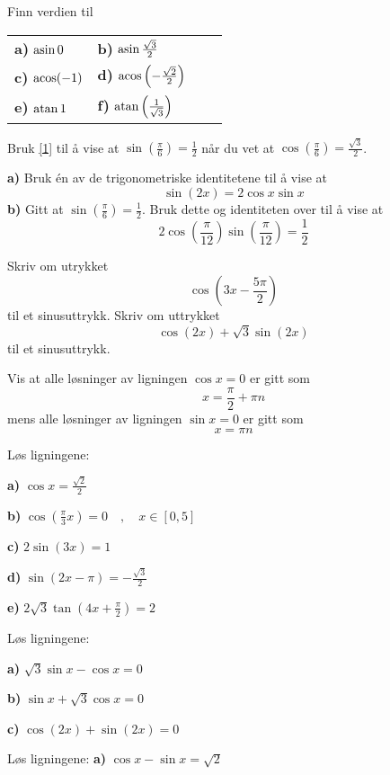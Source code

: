 Finn verdien til\\ \renewcommand{\arraystretch}{1.7}
\begin{tabular}{@{}l l l l }	
\textbf{a)} $ \operatorname{asin} 0 $ &\quad\textbf{b)} $ \operatorname{asin} \frac{\sqrt{3}}{2} $ \\
 \textbf{c)} $ \operatorname{acos} (-1) $ &\quad\textbf{d)} $ \operatorname{acos} \left(-\frac{\sqrt{2}}{2}\right) $ \\
 \textbf{e)} $ \operatorname{atan} 1 $ &\quad\textbf{f)} $ \operatorname{atan} \left(\frac{1}{\sqrt{3}}\right) $
\end{tabular}\renewcommand{\arraystretch}{1}

Bruk \eqref{1} til å vise at $ {\sin\left(\frac{\pi}{6}\right)=\frac{1}{2}} $ når du vet at $ \cos\left(\frac{\pi}{6}\right)=\frac{\sqrt{3}}{2} $.

\textbf{a)} Bruk én av de trigonometriske identitetene til å vise at
\[  \sin (2x)=2\cos x\sin x \]
\textbf{b)} Gitt at $ {\sin \left(\frac{\pi}{6}\right)=\frac{1}{2}} $. Bruk dette og identiteten over til å vise at
\[ 2\cos \left(\frac{\pi}{12}\right)\sin \left(\frac{\pi}{12}\right) = \frac{1}{2} \]

Skriv om utrykket
\[ \cos \left(3x-\frac{5\pi}{2}\right) \]
til et sinusuttrykk.
\newpage
{}
Skriv om uttrykket \[ \cos( 2x) + \sqrt 3\sin (2x) \]
til et sinusuttrykk.

\nes

Vis at alle løsninger av ligningen $ \cos x=0 $ er gitt som
\[ x = \frac{\pi}{2}+\pi n \]
mens alle løsninger av ligningen $ \sin x = 0 $ er gitt som
\[ x = \pi n \]\vs \vs

Løs ligningene:\os

\textbf{a)} $ \cos x=\frac{\sqrt{2}}{2} $\os

\textbf{b)} $ \cos \left(\frac{\pi}{3}x\right) = 0\quad,\quad x\in[0, 5]$\os

\textbf{c)} $ 2\sin(3x)=1 $\os

\textbf{d)} $ \sin(2x-\pi)=-\frac{\sqrt{3}}{2} $\os

\textbf{e)} $ 2\sqrt{3}\tan \left(4x+\frac{\pi}{2}\right) = 2$ \os

Løs ligningene:\os

\textbf{a)} $\sqrt{3} \sin x - \cos x =0$\os

\textbf{b)} $ \sin x + \sqrt{3}\cos x =0$\os

\textbf{c)} $ \cos (2x) + \sin (2x)=0  $\os


Løs ligningene:\os
\textbf{a)} $ \cos x - \sin x = \sqrt{2}  $ \os

